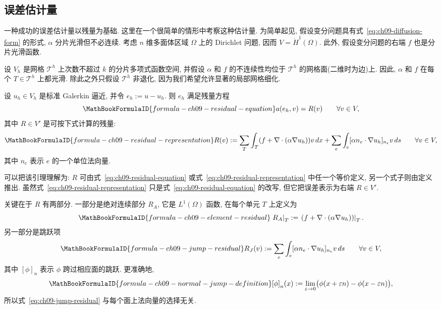 \subsection{误差估计量}
\label{sec:ch09-error-estimators}
\setcounter{thmcount}{0}
\setcounter{equation}{0}

一种成功的误差估计量以残量为基础. 这里在一个很简单的情形中考察这种估计量. 为简单起见, 假设变分问题具有式~\eqref{eq:ch09-diffusion-form} 的形式, $\alpha$ 分片光滑但不必连续. 考虑 $n$ 维多面体区域 $\Omega$ 上的 Dirichlet 问题, 因而 $V=\mathring H^1(\Omega)$. 此外, 假设变分问题的右端 $f$ 也是分片光滑函数.

设 $V_h$ 是网格 $\mathcal T^h$ 上次数不超过 $k$ 的分片多项式函数空间, 并假设 $\alpha$ 和 $f$ 的不连续性均位于 $\mathcal T^h$ 的网格面(二维时为边)上. 因此, $\alpha$ 和 $f$ 在每个 $T\in\mathcal T^h$ 上都光滑. 除此之外只假设 $\mathcal T^h$ 非退化, 因为我们希望允许显著的局部网格细化.

\begin{Lemma}
\label{lem:ch09-residual-equation}
设 $u_h\in V_h$ 是标准 Galerkin 逼近, 并令 $e_h:=u-u_h$. 则 $e_h$ 满足残量方程
\begin{equation}
\MathBookFormulaID{formula-ch09-residual-equation}
\label{eq:ch09-residual-equation}
a(e_h,v)=R(v)
\qquad\forall v\in V,
\end{equation}
其中 $R\in V'$ 是可按下式计算的残量:
\begin{equation}
\MathBookFormulaID{formula-ch09-residual-representation}
\label{eq:ch09-residual-representation}
R(v):=\sum_T\int_T(f+\nabla\cdot(\alpha\nabla u_h))v\,dx
+\sum_e\int_e[\alpha n_e\cdot\nabla u_h]_{n_e}v\,ds
\qquad\forall v\in V,
\end{equation}
其中 $n_e$ 表示 $e$ 的一个单位法向量.
\end{Lemma}

可以把该引理理解为: $R$ 可由式~\eqref{eq:ch09-residual-equation} 或式~\eqref{eq:ch09-residual-representation} 中任一个等价定义, 另一个式子则由定义推出. 虽然式~\eqref{eq:ch09-residual-representation} 只是式~\eqref{eq:ch09-residual-equation} 的改写, 但它把误差表示为右端 $R\in V'$.

关键在于 $R$ 有两部分. 一部分是绝对连续部分 $R_A$, 它是 $L^1(\Omega)$ 函数, 在每个单元 $T$ 上定义为
\begin{equation}
\MathBookFormulaID{formula-ch09-element-residual}
\label{eq:ch09-element-residual}
\left.R_A\right|_T:=\left.(f+\nabla\cdot(\alpha\nabla u_h))\right|_T.
\end{equation}
另一部分是跳跃项
\begin{equation}
\MathBookFormulaID{formula-ch09-jump-residual}
\label{eq:ch09-jump-residual}
R_J(v):=\sum_e\int_e[\alpha n_e\cdot\nabla u_h]_{n_e}v\,ds
\qquad\forall v\in V,
\end{equation}
其中 $[\phi]_n$ 表示 $\phi$ 跨过相应面的跳跃. 更准确地,
\[
\MathBookFormulaID{formula-ch09-normal-jump-definition}
[\phi]_n(x):=\lim_{\varepsilon\to0}\bigl(\phi(x+\varepsilon n)-\phi(x-\varepsilon n)\bigr),
\]
所以式~\eqref{eq:ch09-jump-residual} 与每个面上法向量的选择无关.

